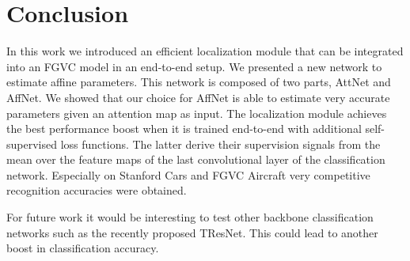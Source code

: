 \documentclass{bmvc2k}
\begin{document}
\section{Conclusion}
In this work we introduced an efficient localization module that can be integrated into an FGVC model in an end-to-end setup. We presented a new network to estimate affine parameters. This network is composed of two parts, AttNet and AffNet. We showed that our choice for AffNet is able to estimate very accurate parameters given an attention map as input. The localization module achieves the best performance boost when it is trained end-to-end with additional self-supervised loss functions. The latter derive their supervision signals from the mean over the feature maps of the last convolutional layer of the classification network. Especially on Stanford Cars and FGVC Aircraft very competitive recognition accuracies were obtained.

For future work it would be interesting to test other backbone classification networks such as the recently proposed TResNet. This could lead to another boost in classification accuracy.



\end{document}
